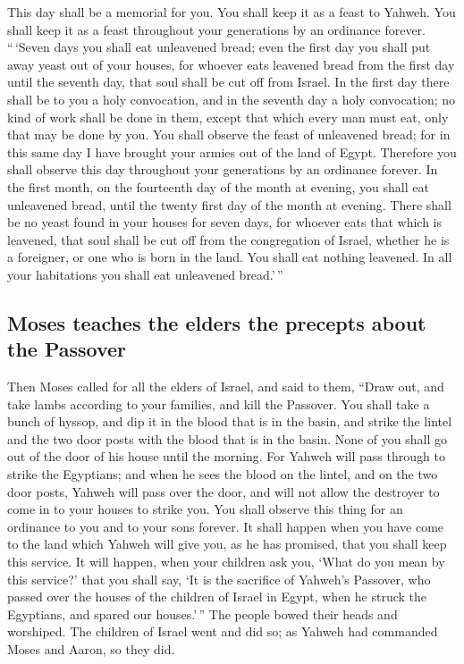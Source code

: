  This day shall be a memorial for you. You shall keep it
as a feast to Yahweh. You shall keep it as a feast throughout your
generations by an ordinance forever.  ``\,`Seven days you
shall eat unleavened bread; even the first day you shall put away yeast
out of your houses, for whoever eats leavened bread from the first day
until the seventh day, that soul shall be cut off from Israel.
 In the first day there shall be to you a holy
convocation, and in the seventh day a holy convocation; no kind of work
shall be done in them, except that which every man must eat, only that
may be done by you.  You shall observe the feast of
unleavened bread; for in this same day I have brought your armies out of
the land of Egypt. Therefore you shall observe this day throughout your
generations by an ordinance forever.  In the first month,
on the fourteenth day of the month at evening, you shall eat unleavened
bread, until the twenty first day of the month at evening.
 There shall be no yeast found in your houses for seven
days, for whoever eats that which is leavened, that soul shall be cut
off from the congregation of Israel, whether he is a foreigner, or one
who is born in the land.  You shall eat nothing leavened.
In all your habitations you shall eat unleavened bread.'\,''

\hypertarget{moses-teaches-the-elders-the-precepts-about-the-passover}{%
\subsection{Moses teaches the elders the precepts about the
Passover}\label{moses-teaches-the-elders-the-precepts-about-the-passover}}

 Then Moses called for all the elders of Israel, and said
to them, ``Draw out, and take lambs according to your families, and kill
the Passover.  You shall take a bunch of hyssop, and dip
it in the blood that is in the basin, and strike the lintel and the two
door posts with the blood that is in the basin. None of you shall go out
of the door of his house until the morning.  For Yahweh
will pass through to strike the Egyptians; and when he sees the blood on
the lintel, and on the two door posts, Yahweh will pass over the door,
and will not allow the destroyer to come in to your houses to strike
you.  You shall observe this thing for an ordinance to
you and to your sons forever.  It shall happen when you
have come to the land which Yahweh will give you, as he has promised,
that you shall keep this service.  It will happen, when
your children ask you, `What do you mean by this service?'
 that you shall say, `It is the sacrifice of Yahweh's
Passover, who passed over the houses of the children of Israel in Egypt,
when he struck the Egyptians, and spared our houses.'\,'' The people
bowed their heads and worshiped.  The children of Israel
went and did so; as Yahweh had commanded Moses and Aaron, so they did.

